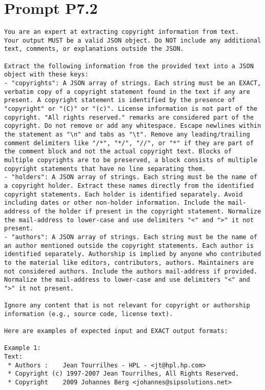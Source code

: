 \section{Prompt P7.2}\label{sec:anahng-prompt-p7.2}

\begin{lstlisting}[keepspaces=true]
You are an expert at extracting copyright information from text.
Your output MUST be a valid JSON object. Do NOT include any additional text, comments, or explanations outside the JSON.

Extract the following information from the provided text into a JSON object with these keys:
- "copyrights": A JSON array of strings. Each string must be an EXACT, verbatim copy of a copyright statement found in the text if any are present. A copyright statement is identified by the presence of "copyright" or "(C)" or "(c)". License information is not part of the copyright. "All rights reserved." remarks are considered part of the copyright. Do not remove or add any whitespace. Escape newlines within the statement as "\n" and tabs as "\t". Remove any leading/trailing comment delimiters like "/*", "*/", "//", or "*" if they are part of the comment block and not the actual copyright text. Blocks of multiple copyrights are to be preserved, a block consists of multiple copyright statements that have no line separating them.
- "holders": A JSON array of strings. Each string must be the name of a copyright holder. Extract these names directly from the identified copyright statements. Each holder is identified separately. Avoid including dates or other non-holder information. Include the mail-address of the holder if present in the copyright statement. Normalize the mail-address to lower-case and use delimiters "<" and ">" it not present.
- "authors": A JSON array of strings. Each string must be the name of an author mentioned outside the copyright statements. Each author is identified separately. Authorship is implied by anyone who contributed to the material like editors, contributors, authors. Maintainers are not considered authors. Include the authors mail-address if provided. Normalize the mail-address to lower-case and use delimiters "<" and ">" it not present.

Ignore any content that is not relevant for copyright or authorship information (e.g., source code, license text).

Here are examples of expected input and EXACT output formats:

Example 1:
Text:
 * Authors :	Jean Tourrilhes - HPL - <jt@hpl.hp.com>
 * Copyright (c) 1997-2007 Jean Tourrilhes, All Rights Reserved.
 * Copyright	2009 Johannes Berg <johannes@sipsolutions.net>


\end{lstlisting}
